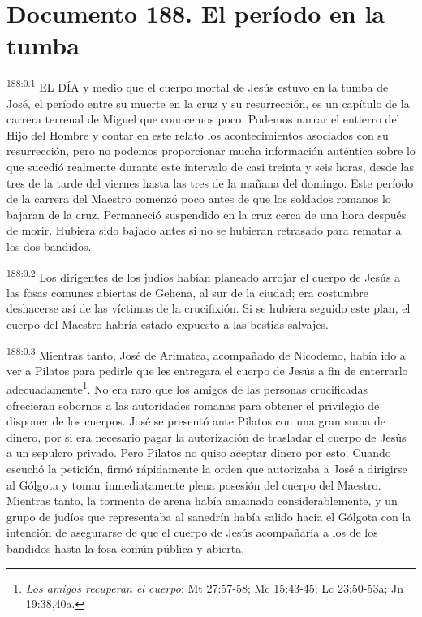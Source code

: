 \chapter{Documento 188. El período en la tumba}
\par 
\textsuperscript{188:0.1} EL DÍA y medio que el cuerpo mortal de Jesús estuvo en la tumba de José, el período entre su muerte en la cruz y su resurrección, es un capítulo de la carrera terrenal de Miguel que conocemos poco. Podemos narrar el entierro del Hijo del Hombre y contar en este relato los acontecimientos asociados con su resurrección, pero no podemos proporcionar mucha información auténtica sobre lo que sucedió realmente durante este intervalo de casi treinta y seis horas, desde las tres de la tarde del viernes hasta las tres de la mañana del domingo. Este período de la carrera del Maestro comenzó poco antes de que los soldados romanos lo bajaran de la cruz. Permaneció suspendido en la cruz cerca de una hora después de morir. Hubiera sido bajado antes si no se hubieran retrasado para rematar a los dos bandidos.

\par 
\textsuperscript{188:0.2} Los dirigentes de los judíos habían planeado arrojar el cuerpo de Jesús a las fosas comunes abiertas de Gehena, al sur de la ciudad; era costumbre deshacerse así de las víctimas de la crucifixión. Si se hubiera seguido este plan, el cuerpo del Maestro habría estado expuesto a las bestias salvajes.

\par 
\textsuperscript{188:0.3} Mientras tanto, José de Arimatea, acompañado de Nicodemo, había ido a ver a Pilatos para pedirle que les entregara el cuerpo de Jesús a fin de enterrarlo adecuadamente\footnote{\textit{Los amigos recuperan el cuerpo}: Mt 27:57-58; Mc 15:43-45; Lc 23:50-53a; Jn 19:38,40a.}. No era raro que los amigos de las personas crucificadas ofrecieran sobornos a las autoridades romanas para obtener el privilegio de disponer de los cuerpos. José se presentó ante Pilatos con una gran suma de dinero, por si era necesario pagar la autorización de trasladar el cuerpo de Jesús a un sepulcro privado. Pero Pilatos no quiso aceptar dinero por esto. Cuando escuchó la petición, firmó rápidamente la orden que autorizaba a José a dirigirse al Gólgota y tomar inmediatamente plena posesión del cuerpo del Maestro. Mientras tanto, la tormenta de arena había amainado considerablemente, y un grupo de judíos que representaba al sanedrín había salido hacia el Gólgota con la intención de asegurarse de que el cuerpo de Jesús acompañaría a los de los bandidos hasta la fosa común pública y abierta.

